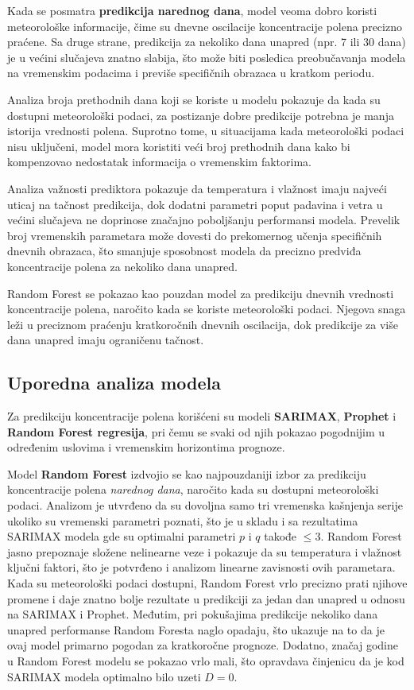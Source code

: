 \documentclass[12pt]{article}
\begin{document}
Kada se posmatra \textbf{predikcija narednog dana}, model veoma dobro koristi meteorološke informacije, čime su dnevne oscilacije koncentracije polena precizno praćene. Sa druge strane, predikcija za nekoliko dana unapred (npr. 7 ili 30 dana) je u većini slučajeva znatno slabija, što može biti posledica preobučavanja modela na vremenskim podacima i previše specifičnih obrazaca u kratkom periodu.

Analiza broja prethodnih dana koji se koriste u modelu pokazuje da kada su dostupni meteorološki podaci, za postizanje dobre predikcije potrebna je manja istorija vrednosti polena. Suprotno tome, u situacijama kada meteorološki podaci nisu uključeni, model mora koristiti veći broj prethodnih dana kako bi kompenzovao nedostatak informacija o vremenskim faktorima.

Analiza važnosti prediktora pokazuje da temperatura i vlažnost imaju najveći uticaj na tačnost predikcija, dok dodatni parametri poput padavina i vetra u većini slučajeva ne doprinose značajno poboljšanju performansi modela. Prevelik broj vremenskih parametara može dovesti do prekomernog učenja specifičnih dnevnih obrazaca, što smanjuje sposobnost modela da precizno predviđa koncentracije polena za nekoliko dana unapred.

Random Forest se pokazao kao pouzdan model za predikciju dnevnih vrednosti koncentracije polena, naročito kada se koriste meteorološki podaci. Njegova snaga leži u preciznom praćenju kratkoročnih dnevnih oscilacija, dok predikcije za više dana unapred imaju ograničenu tačnost.

\subsection{Uporedna analiza modela}

Za predikciju koncentracije polena korišćeni su modeli \textbf{SARIMAX}, \textbf{Prophet} i \textbf{Random Forest regresija}, pri čemu se svaki od njih pokazao pogodnijim u određenim uslovima i vremenskim horizontima prognoze.

Model \textbf{Random Forest} izdvojio se kao najpouzdaniji izbor za predikciju koncentracije polena \textit{narednog dana}, naročito kada su dostupni meteorološki podaci. Analizom je utvrđeno da su dovoljna samo tri vremenska kašnjenja serije ukoliko su vremenski parametri poznati, što je u skladu i sa rezultatima SARIMAX modela gde su optimalni parametri $p$ i $q$ takođe $\leq 3$. Random Forest jasno prepoznaje složene nelinearne veze i pokazuje da su temperatura i vlažnost ključni faktori, što je potvrđeno i analizom linearne zavisnosti ovih parametara. Kada su meteorološki podaci dostupni, Random Forest vrlo precizno prati njihove promene i daje znatno bolje rezultate u predikciji za jedan dan unapred u odnosu na SARIMAX i Prophet. Međutim, pri pokušajima predikcije nekoliko dana unapred performanse Random Foresta naglo opadaju, što ukazuje na to da je ovaj model primarno pogodan za kratkoročne prognoze.
Dodatno, značaj godine u Random Forest modelu se pokazao vrlo mali, što opravdava činjenicu da je kod SARIMAX modela optimalno bilo uzeti $D = 0$.
\end{document}
